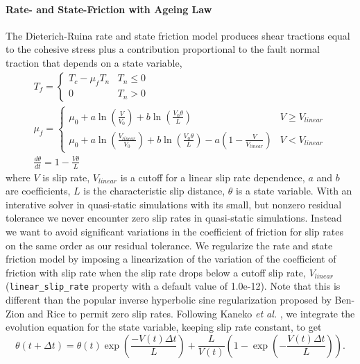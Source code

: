 \paragraph{\label{sec:friction:rate:state:ageing}Rate- and State-Friction with
Ageing Law}

The Dieterich-Ruina rate and state friction model produces shear tractions
equal to the cohesive stress plus a contribution proportional to the
fault normal traction that depends on a state variable,
\begin{gather}
T_{f}=\begin{cases}
T_{c}-\mu_{f}T_{n} & T_{n}\leq0\\
0 & T_{n}>0
\end{cases}\\
\mu_{f}=\begin{cases}
\mu_{0}+a\ln\left(\frac{V}{V_{0}}\right)+b\ln\left(\frac{V_{0}\theta}{L}\right) & V\ge V_{\mathit{linear}}\\
\mu_{0}+a\ln\left(\frac{V_{linear}}{V_{0}}\right)+b\ln\left(\frac{V_{0}\theta}{L}\right)-a\left(1-\frac{V}{V_{linear}}\right) & V<V_{linear}
\end{cases}\\
\frac{d\theta}{dt}=1-\frac{V\theta}{L}
\end{gather}
where $V$ is slip rate, $V_{linear}$ is a cutoff for a linear slip
rate dependence, $a$ and $b$ are coefficients, $L$ is the characteristic
slip distance, $\theta$ is a state variable. With an interative solver
in quasi-static simulations with its small, but nonzero residual tolerance
we never encounter zero slip rates in quasi-static simulations. Instead
we want to avoid significant variations in the coefficient of friction
for slip rates on the same order as our residual tolerance. We regularize
the rate and state friction model by imposing a linearization of the
variation of the coefficient of friction with slip rate when the slip
rate drops below a cutoff slip rate, $V_{linear}$ (\texttt{linear\_slip\_rate}
property with a default value of 1.0e-12). Note that this is different
than the popular inverse hyperbolic sine regularization proposed by
Ben-Zion and Rice \cite{BenZion:Rice:1997} to permit zero slip rates.
Following Kaneko \textit{et al.} \cite{Kaneko:etal:2008}, we integrate
the evolution equation for the state variable, keeping slip rate constant,
to get
\begin{equation}
\theta(t+\Delta t)=\theta(t)\exp\left(\frac{-V(t)\Delta t}{L}\right)+\frac{L}{V(t)}\left(1-\exp\left(-\frac{V(t)\Delta t}{L}\right)\right).
\end{equation}
